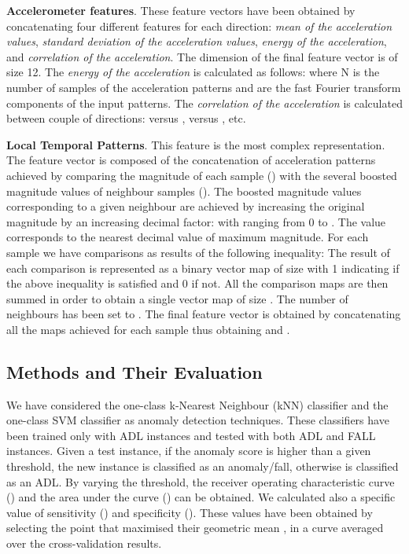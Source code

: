 \documentclass[twocolumn]{svjour3}          \smartqed  \usepackage[draft]{hyperref}
\begin{document}
\noindent \textbf{Accelerometer features}. These feature vectors have been obtained by concatenating four different features for each direction: \emph{mean of the acceleration values}, \emph{standard deviation of the acceleration values}, \emph{energy of the acceleration}, and  \emph{correlation of the acceleration}. The dimension of the final feature vector is of size 12. The \emph{energy of the acceleration}  is calculated as follows:  where N is the number of samples of the acceleration patterns and  are the fast Fourier transform  components of the input patterns. The \emph{correlation of the acceleration} is calculated between couple of directions:  versus ,  versus , etc.

\noindent \textbf{Local Temporal Patterns}. This feature is the most complex representation. The feature vector is composed of the concatenation of acceleration patterns achieved by comparing the magnitude of each sample () with the several boosted magnitude values of  neighbour samples (). The boosted magnitude values corresponding to a given neighbour  are achieved by increasing the original magnitude by an increasing decimal factor:  with  ranging from 0 to . The value  corresponds to the nearest decimal value of maximum magnitude. For each sample we have  comparisons as results of the following inequality:   The result of each comparison is represented as a binary vector map of size  with 1 indicating if the above inequality is satisfied and 0 if not.  All the comparison maps are then summed in order to obtain a single vector map of size . The number of neighbours has been set to . The final feature vector is obtained by concatenating all the maps achieved for each sample thus obtaining  and .

\subsection{Methods and Their Evaluation}
\label{subsec:Methods}

We have considered the {one-class} k-Nearest Neighbour (kNN) classifier and the {one-class} SVM classifier as anomaly detection techniques. These classifiers have been trained only with ADL instances and tested with both ADL and FALL instances. Given a test instance, if the anomaly score is higher than a given threshold, the new instance is classified as an anomaly/fall, otherwise is classified as an ADL. By varying the threshold, the receiver
operating characteristic curve () and the area under the  curve () can be obtained. We calculated also a specific value of sensitivity () and specificity (). These values have been obtained by selecting the point that maximised their geometric mean , in a  curve averaged over the cross-validation results.
\end{document}
